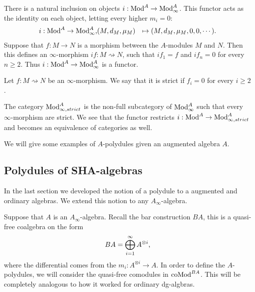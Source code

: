 \documentclass[../thesis.tex]{subfiles}
\begin{document}
            There is a natural inclusion on objects $i : \tt{Mod}^A \rightarrow \tt{Mod}_\infty^A$. This functor acts as the identity on each object, letting every higher $m_i = 0$:
            \begin{align*}
                i : \tt{Mod}^A & \rightarrow \tt{Mod}_\infty^A\tt{,}
                (M, d_M, \mu_M) & \mapsto (M, d_M, \mu_M, 0, 0, \cdots)\tt{.}
            \end{align*}
            Suppose that $f : M \rightarrow N$ is a morphism between the $A$-modules $M$ and $N$. Then this defines an $\infty$-morphism $if : M \rightsquigarrow N$, such that $if_1 = f$ and $if_n = 0$ for every $n \geq 2$. Thus $i : \tt{Mod}^A \rightarrow \tt{Mod}_\infty^A$ is a functor.
            
            \begin{definition}
                Let $f : M \rightsquigarrow N$ be an $\infty$-morphism. We say that it is strict if $f_i = 0$ for every $i \geq 2$.
            \end{definition}

            The category $\tt{Mod}_{\infty, strict}^A$ is the non-full subcategory of $\tt{Mod}_{\infty}^A$ such that every $\infty$-morphism are strict. We see that the functor restricts $i : \tt{Mod}^A \rightarrow \tt{Mod}_{\infty, strict}^A$ and becomes an equivalence of categories as well.
            
            We will give some examples of $A$-polydules given an augmented algebra $A$.\todo{!!!}

        \subsection{Polydules of SHA-algebras}
            In the last section we developed the notion of a polydule to a augmented and ordinary algebras. We extend this notion to any $A_\infty$-algebra.

            Suppose that $A$ is an $A_\infty$-algebra. Recall the bar construction $BA$, this is a quasi-free coalgebra on the form
            \begin{align*}
                BA = \bigoplus_{i=1}^\infty A^{\otimes i}\tt{,}
            \end{align*}
            where the differential comes from the $m_i : A^{\otimes i} \rightarrow A$. In order to define the $A$-polydules, we will consider the quasi-free comodules in $\tt{coMod}^{BA}$. This will be completely analogous to how it worked for ordinary dg-algbras.
            
\end{document}
